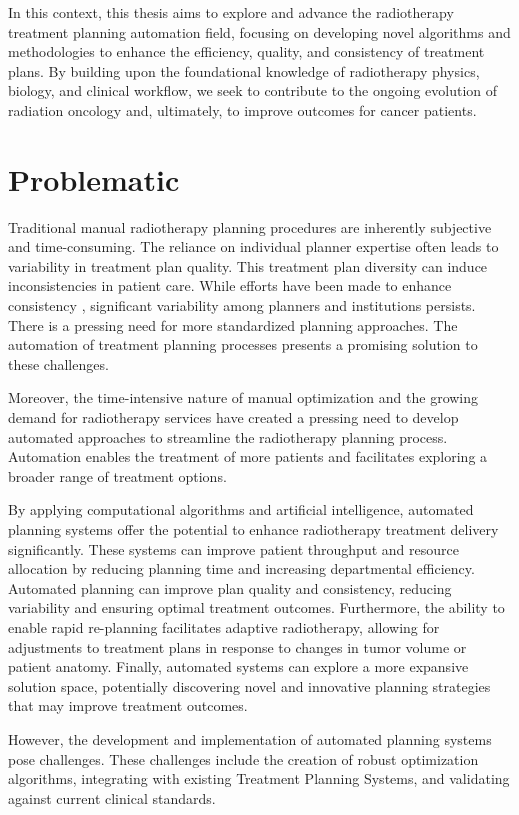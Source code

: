 In this context, this thesis aims to explore and advance the radiotherapy treatment planning automation field, focusing on developing novel algorithms and methodologies to enhance the efficiency, quality, and consistency of treatment plans.
By building upon the foundational knowledge of radiotherapy physics, biology, and clinical workflow, we seek to contribute to the ongoing evolution of radiation oncology and, ultimately, to improve outcomes for cancer patients.

\section{Problematic}
Traditional manual radiotherapy planning procedures are inherently subjective and time-consuming.
The reliance on individual planner expertise often leads to variability in treatment plan quality\cite{Chung2008,Bohsung2005,Das2008,Williams2007}.
This treatment plan diversity can induce inconsistencies in patient care.
While efforts have been made to enhance consistency \cite{Bahm2011}, significant variability among planners and institutions persists.
There is a pressing need for more standardized planning approaches.
The automation of treatment planning processes presents a promising solution to these challenges.

Moreover, the time-intensive nature of manual optimization and the growing demand for radiotherapy services have created a pressing need to develop automated approaches to streamline the radiotherapy planning process.
Automation enables the treatment of more patients and facilitates exploring a broader range of treatment options.

By applying computational algorithms and artificial intelligence, automated planning systems offer the potential to enhance radiotherapy treatment delivery significantly.
These systems can improve patient throughput and resource allocation by reducing planning time and increasing departmental efficiency.
Automated planning can improve plan quality and consistency, reducing variability and ensuring optimal treatment outcomes.
Furthermore, the ability to enable rapid re-planning facilitates adaptive radiotherapy, allowing for adjustments to treatment plans in response to changes in tumor volume or patient anatomy.
Finally, automated systems can explore a more expansive solution space, potentially discovering novel and innovative planning strategies that may improve treatment outcomes.

However, the development and implementation of automated planning systems pose challenges.
These challenges include the creation of robust optimization algorithms, integrating with existing Treatment Planning Systems, and validating against current clinical standards.

